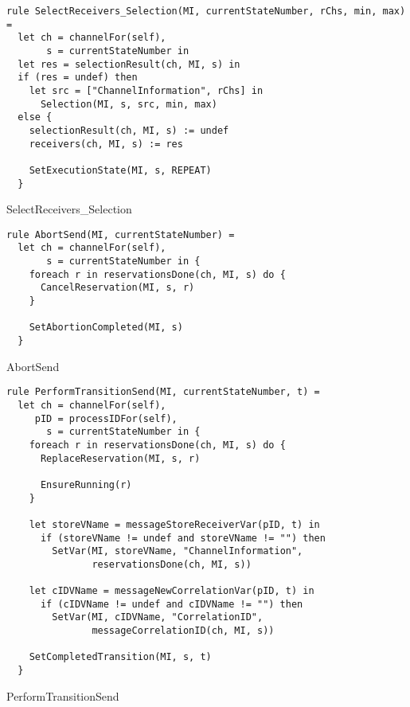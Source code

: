 \begin{listing}[H]
\begin{verbatim}
rule SelectReceivers_Selection(MI, currentStateNumber, rChs, min, max) =
  let ch = channelFor(self),
       s = currentStateNumber in
  let res = selectionResult(ch, MI, s) in
  if (res = undef) then
    let src = ["ChannelInformation", rChs] in
      Selection(MI, s, src, min, max)
  else {
    selectionResult(ch, MI, s) := undef
    receivers(ch, MI, s) := res

    SetExecutionState(MI, s, REPEAT)
  }
\end{verbatim}
\caption{SelectReceivers\_Selection}
\label{lst:asm:SelectReceivers_Selection}
\end{listing}




\begin{listing}[H]
\begin{verbatim}
rule AbortSend(MI, currentStateNumber) =
  let ch = channelFor(self),
       s = currentStateNumber in {
    foreach r in reservationsDone(ch, MI, s) do {
      CancelReservation(MI, s, r)
    }

    SetAbortionCompleted(MI, s)
  }
\end{verbatim}
\caption{AbortSend}
\label{lst:asm:AbortSend}
\end{listing}




\begin{listing}[H]
\begin{verbatim}
rule PerformTransitionSend(MI, currentStateNumber, t) =
  let ch = channelFor(self),
     pID = processIDFor(self),
       s = currentStateNumber in {
    foreach r in reservationsDone(ch, MI, s) do {
      ReplaceReservation(MI, s, r)

      EnsureRunning(r)
    }

    let storeVName = messageStoreReceiverVar(pID, t) in
      if (storeVName != undef and storeVName != "") then
        SetVar(MI, storeVName, "ChannelInformation",
               reservationsDone(ch, MI, s))

    let cIDVName = messageNewCorrelationVar(pID, t) in
      if (cIDVName != undef and cIDVName != "") then
        SetVar(MI, cIDVName, "CorrelationID",
               messageCorrelationID(ch, MI, s))

    SetCompletedTransition(MI, s, t)
  }
\end{verbatim}
\caption{PerformTransitionSend}
\label{lst:asm:PerformTransitionSend}
\end{listing}




